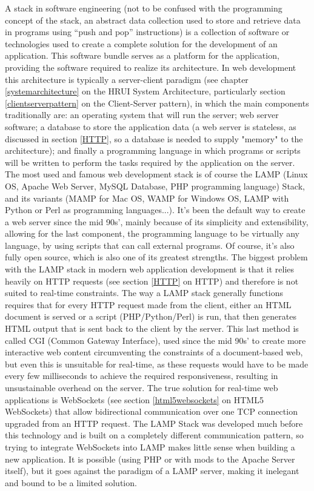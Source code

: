 A stack in software engineering (not to be confused with the programming concept of the stack, an abstract data collection
used to store and retrieve data in programs using ``push and pop'' instructions) is a collection of software or technologies
used to create a complete solution for the development of an application. This software bundle serves as a platform for the
application, providing the software required to realize its architecture. In web development this architecture is typically a
server-client paradigm (see chapter \ref{systemarchitecture} on the HRUI System Architecture, particularly section 
\ref{clientserverpattern} on the Client-Server pattern), in which the main components traditionally are: an operating system that will
run the server; web server software; a database to store the application data (a web server is stateless, as discussed in section
\ref{HTTP}, so a database is needed to supply "memory" to the architecture); and finally a programming language in which programs or
scripts will be written to perform the tasks required by the application on the server.\\

The most used and famous web development stack is of course the LAMP (Linux OS, Apache Web Server, MySQL Database, PHP
programming language) Stack, and its variants (MAMP for Mac OS, WAMP for Windows OS, LAMP with Python or Perl as programming
languages...). It's been the default way to create a web server since the mid 90s', mainly because of its simplicity and
extensibility, allowing for the last component, the programming language to be virtually any language, by using scripts that
can call external programs. Of course, it's also fully open source, which is also one of its greatest strengths. The biggest
problem with the LAMP stack in modern web application development is that it relies heavily on HTTP requests (see section \ref{HTTP} on
HTTP) and therefore is not suited to real-time constraints. The way a LAMP stack generally functions requires that for every HTTP
request made from the client, either an HTML document is served or a script (PHP/Python/Perl) is run, that then
generates HTML output that is sent back to the client by the server. This last method is called CGI (Common Gateway
Interface), used since the mid 90s' to create more interactive web content circumventing the constraints of a document-based
web, but even this is unsuitable for real-time, as these requests would have to be made every few milliseconds to achieve the
required responsiveness, resulting in unsustainable overhead on the server. The true solution for real-time web applications
is WebSockets (see section \ref{html5websockets} on HTML5 WebSockets) that allow bidirectional communication over one TCP
connection upgraded from an HTTP request. The LAMP Stack was developed much before this technology and is built on a
completely different communication pattern, so trying to integrate WebSockets into LAMP makes little sense when building a new
application. It is possible (using PHP or with mods to the Apache Server itself), but it goes against the paradigm of a LAMP
server, making it inelegant and bound to be a limited solution.\\


